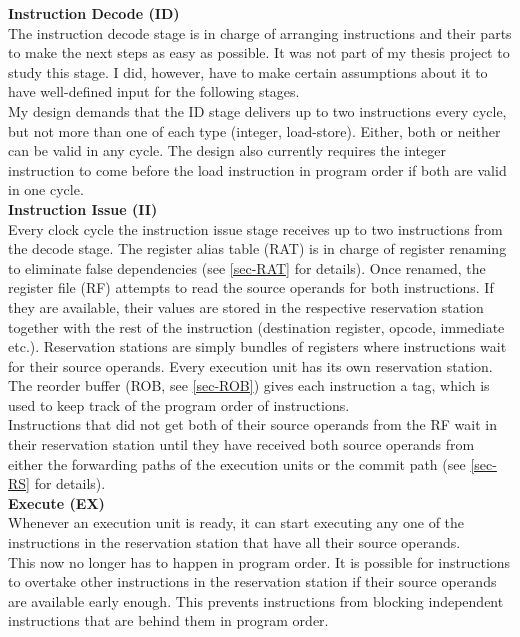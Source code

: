 \documentclass[12pt,a4paper]{article} %
\begin{document}
\textbf{Instruction Decode (ID)}\\
The instruction decode stage is in charge of arranging instructions and their parts to make the next steps as easy as possible. It was not part of my thesis project to study this stage. I did, however, have to make certain assumptions about it to have well-defined input for the following stages.\\
My design demands that the ID stage delivers up to two instructions every cycle, but not more than one of each type (integer, load-store). Either, both or neither can be valid in any cycle. The design also currently requires the integer instruction to come before the load instruction in program order if both are valid in one cycle.\\

\textbf{Instruction Issue (II)}\\
Every clock cycle the instruction issue stage receives up to two instructions from the decode stage. The register alias table (RAT) is in charge of register renaming to eliminate false dependencies (see \ref{sec-RAT} for details). Once renamed, the register file (RF) attempts to read the source operands for both instructions. If they are available, their values are stored in the respective reservation station together with the rest of the instruction (destination register, opcode, immediate etc.). Reservation stations are simply bundles of registers where instructions wait for their source operands. Every execution unit has its own reservation station. The reorder buffer (ROB, see \ref{sec-ROB}) gives each instruction a tag, which is used to keep track of the program order of instructions.\\
Instructions that did not get both of their source operands from the RF wait in their reservation station until they have received both source operands from either the forwarding paths of the execution units or the commit path (see \ref{sec-RS} for details).\\

\textbf{Execute (EX)}\\
Whenever an execution unit is ready, it can start executing any one of the instructions in the reservation station that have all their source operands. \\
This now no longer has to happen in program order. It is possible for instructions to overtake other instructions in the reservation station if their source operands are available early enough. This prevents instructions from blocking independent instructions that are behind them in program order.\\
\end{document}
